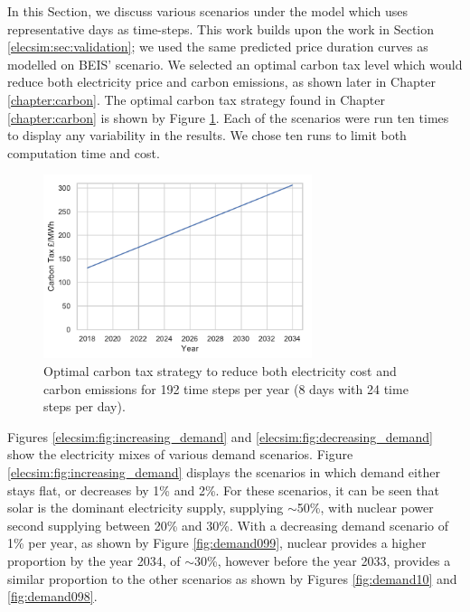 In this Section, we discuss various scenarios under the model which uses representative days as time-steps. This work builds upon the work in Section \ref{elecsim:sec:validation}; we used the same predicted price duration curves as modelled on BEIS' scenario. We selected an optimal carbon tax level which would reduce both electricity price and carbon emissions, as shown later in Chapter \ref{chapter:carbon}. The optimal carbon tax strategy found in Chapter \ref{chapter:carbon} is shown by Figure \ref{elecsim:fig:optimal_carbon_tax_strategy}. Each of the scenarios were run ten times to display any variability in the results. We chose ten runs to limit both computation time and cost.



\begin{figure}
	\centering
	\includegraphics[width=0.7\textwidth, keepaspectratio]{Chapter4/figures/scenarios/representative-day-scenarios/optimal_carbon_strategy.pdf}
	\caption{Optimal carbon tax strategy to reduce both electricity cost and carbon emissions for 192 time steps per year (8 days with 24 time steps per day).}
	\label{elecsim:fig:optimal_carbon_tax_strategy}
\end{figure}

Figures \ref{elecsim:fig:increasing_demand} and \ref{elecsim:fig:decreasing_demand} show the electricity mixes of various demand scenarios. Figure \ref{elecsim:fig:increasing_demand} displays the scenarios in which demand either stays flat, or decreases by 1\% and 2\%. For these scenarios, it can be seen that solar is the dominant electricity supply, supplying ${\sim}$50\%, with nuclear power second supplying between 20\% and 30\%. With a decreasing demand scenario of 1\% per year, as shown by Figure \ref{fig:demand099}, nuclear provides a higher proportion by the year 2034, of ${\sim}$30\%, however before the year 2033, provides a similar proportion to the other scenarios as shown by Figures \ref{fig:demand10} and \ref{fig:demand098}.


